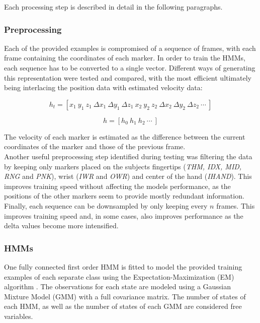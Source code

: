 \documentclass[times,twocolumn,final]{elsarticle}
\begin{document}
Each processing step is described in detail in the following paragraphs.

\subsubsection{Preprocessing}

Each of the provided examples is compromised of a sequence of frames, with each frame containing the coordinates of each marker. In order to train the HMMs, each sequence has to be converted to a single vector. Different ways of generating this representation were tested and compared, with the most efficient ultimately being interlacing the position data with estimated velocity data:

\begin{equation}
h_t = [ x_1 \ y_1 \ z_1 \ \Delta x_1 \ \Delta y_1 \ \Delta z_1 \ x_2 \ y_2 \ z_2 \ \Delta x_2 \ \Delta y_2 \ \Delta z_2 \ \cdots \ ]
\end{equation}

\begin{equation}
h = [ h_0 \ h_1 \ h_2 \ \cdots \ ]
\end{equation}


The velocity of each marker is estimated as the difference between the current coordinates of the marker and those of the previous frame. \\

Another useful preprocessing step identified during testing was filtering the data by keeping only markers placed on the subjects fingertips (\textit{THM, IDX, MID, RNG} and \textit{PNK}), wrist (\textit{IWR} and \textit{OWR}) and center of the hand (\textit{IHAND}). This improves training speed without affecting the models performance, as the positions of the other markers seem to provide mostly redundant information. \\

Finally, each sequence can be downsampled by only keeping every $n$ frames. This improves training speed and, in some cases, also improves performance as the delta values become more intensified.

\subsubsection{HMMs}
One fully connected first order HMM is fitted to model the provided training examples of each separate class using the Expectation-Maximization (EM) algorithm \citep{dempsterMaximumLikelihoodIncomplete1977}. The observations for each state are modeled using a Gaussian Mixture Model (GMM) with a full covariance matrix. The number of states of each HMM, as well as the number of states of each GMM are considered free variables. \\
\end{document}
